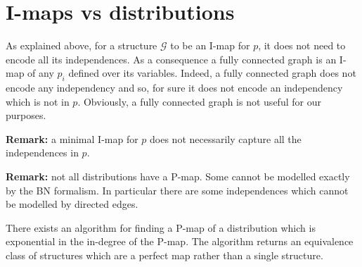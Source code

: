\section{I-maps vs distributions}
As explained above, for a structure $\mathcal{G}$ to be an I-map for $p$, it does not need to encode all its independences. As a consequence a fully connected graph is an I-map of any $p_i$ defined over its variables. Indeed, a fully connected graph does not encode any independency and so, for sure it does not encode an independency which is not in $p$. Obviously, a fully connected graph is not useful for our purposes.


\textbf{Remark:} a minimal I-map for $p$ does not necessarily capture all the independences in $p$.


\textbf{Remark:} not all distributions have a P-map. Some cannot be modelled exactly by the BN formalism. In particular there are some independences which cannot be modelled by directed edges. \newline

There exists an algorithm for finding a P-map of a distribution which is exponential in the in-degree of the P-map. The algorithm returns an equivalence class of structures which are a perfect map rather than a single structure.


